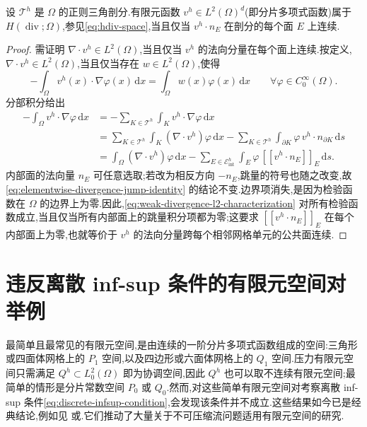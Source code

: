 \begin{lemma}\label{lem:piecewise-polynomial-hdiv}
设 $\mathcal{T}^h$ 是 $\Omega$ 的正则三角剖分.有限元函数 $v^h\in L^2(\Omega)^d$(即分片多项式函数)属于 $H(\operatorname{div};\Omega)$,参见\cref{eq:hdiv-space},当且仅当 $v^h\cdot n_E$ 在剖分的每个面 $E$ 上连续.
\end{lemma}
\begin{proof}
需证明 $\nabla\cdot v^h\in L^2(\Omega)$,当且仅当 $v^h$ 的法向分量在每个面上连续.按定义,$\nabla\cdot v^h\in L^2(\Omega)$,当且仅当存在 $w\in L^2(\Omega)$,使得
\begin{equation}\label{eq:weak-divergence-l2-characterization}
  -\int_\Omega v^h(x)\cdot\nabla\varphi(x)\,\mathrm{d}x
    =\int_\Omega w(x)\varphi(x)\,\mathrm{d}x
    \qquad\forall\varphi\in C_0^\infty(\Omega).
\end{equation}
分部积分给出
\begin{equation}\label{eq:elementwise-divergence-jump-identity}
\begin{aligned}
  -\int_\Omega v^h\cdot\nabla\varphi\,\mathrm{d}x
   &=-\sum_{K\in\mathcal{T}^h}\int_K v^h\cdot\nabla\varphi\,\mathrm{d}x\\
   &=\sum_{K\in\mathcal{T}^h}\int_K(\nabla\cdot v^h)\varphi\,\mathrm{d}x
      -\sum_{K\in\mathcal{T}^h}\int_{\partial K}\varphi\,v^h\cdot n_{\partial K}\,\mathrm{d}s\\
   &=\int_\Omega(\nabla\cdot v^h)\varphi\,\mathrm{d}x
      -\sum_{E\in\mathcal{E}_{\mathrm{int}}^h}
        \int_E\varphi\,[\![v^h\cdot n_E]\!]_E\,\mathrm{d}s.
\end{aligned}
\end{equation}
  内部面的法向量 $n_E$ 可任意选取;若改为相反方向 $-n_E$,跳量的符号也随之改变,故\cref{eq:elementwise-divergence-jump-identity} 的结论不变.边界项消失,是因为检验函数在 $\Omega$ 的边界上为零.因此,\cref{eq:weak-divergence-l2-characterization} 对所有检验函数成立,当且仅当所有内部面上的跳量积分项都为零;这要求 $[\![v^h\cdot n_E]\!]_E$ 在每个内部面上为零,也就等价于 $v^h$ 的法向分量跨每个相邻网格单元的公共面连续.
\end{proof}

\section{违反离散 inf-sup 条件的有限元空间对举例}\label{sec:infsup-violating-pairs}

\begin{note}[低阶有限元空间对]\label{note:low-order-finite-element-pairs}
最简单且最常见的有限元空间,是由连续的一阶分片多项式函数组成的空间:三角形或四面体网格上的 $P_1$ 空间,以及四边形或六面体网格上的 $Q_1$ 空间.压力有限元空间只需满足 $Q^h\subset L_0^2(\Omega)$ 即为协调空间,因此 $Q^h$ 也可以取不连续有限元空间;最简单的情形是分片常数空间 $P_0$ 或 $Q_0$.然而,对这些简单有限元空间对考察离散 inf-sup 条件\cref{eq:discrete-infsup-condition},会发现该条件并不成立.这些结果如今已是经典结论,例如见\textcite[第 II 章第 3.3 节]{GiraultRaviart1986} 或\textcite[第 4.3.2 节]{ErnGuermond2004}.它们推动了大量关于不可压缩流问题适用有限元空间的研究.
\end{note}

